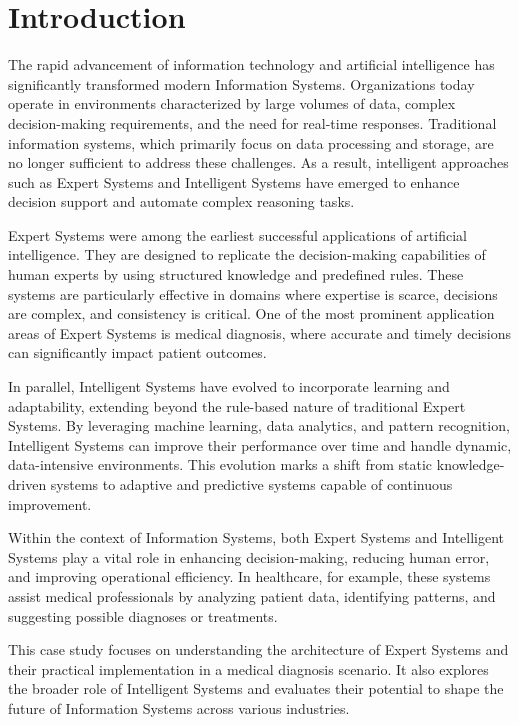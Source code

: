 \documentclass[12pt]{article}
\begin{document}
\newpage
\section{Introduction}

The rapid advancement of information technology and artificial intelligence has significantly transformed modern Information Systems. Organizations today operate in environments characterized by large volumes of data, complex decision-making requirements, and the need for real-time responses. Traditional information systems, which primarily focus on data processing and storage, are no longer sufficient to address these challenges. As a result, intelligent approaches such as Expert Systems and Intelligent Systems have emerged to enhance decision support and automate complex reasoning tasks.

Expert Systems were among the earliest successful applications of artificial intelligence. They are designed to replicate the decision-making capabilities of human experts by using structured knowledge and predefined rules. These systems are particularly effective in domains where expertise is scarce, decisions are complex, and consistency is critical. One of the most prominent application areas of Expert Systems is medical diagnosis, where accurate and timely decisions can significantly impact patient outcomes.

In parallel, Intelligent Systems have evolved to incorporate learning and adaptability, extending beyond the rule-based nature of traditional Expert Systems. By leveraging machine learning, data analytics, and pattern recognition, Intelligent Systems can improve their performance over time and handle dynamic, data-intensive environments. This evolution marks a shift from static knowledge-driven systems to adaptive and predictive systems capable of continuous improvement.

Within the context of Information Systems, both Expert Systems and Intelligent Systems play a vital role in enhancing decision-making, reducing human error, and improving operational efficiency. In healthcare, for example, these systems assist medical professionals by analyzing patient data, identifying patterns, and suggesting possible diagnoses or treatments.

This case study focuses on understanding the architecture of Expert Systems and their practical implementation in a medical diagnosis scenario. It also explores the broader role of Intelligent Systems and evaluates their potential to shape the future of Information Systems across various industries.
\end{document}

